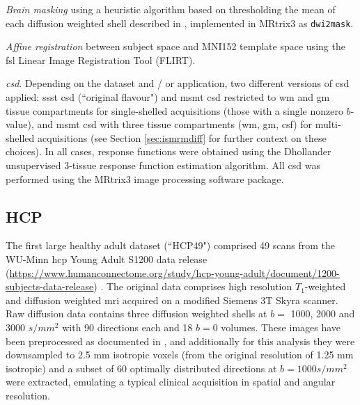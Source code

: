 \textit{Brain masking}\autocite{Tournier2019}
using a heuristic algorithm based on thresholding the mean of each diffusion weighted shell described in \textcite{Dhollander2016}, implemented in MRtrix3\autocite{Tournier2019} as \verb|dwi2mask|.

\textit{Affine registration} between subject space and MNI152\autocite{Fonov2011} template space using the \gls{fsl} Linear Image Registration Tool (FLIRT)\autocite{Jenkinson2001,Jenkinson2002}.

\textit{\Gls{csd}}. Depending on the dataset and / or application, two different versions of \gls{csd} applied: \gls{ssst} \gls{csd}\autocite{Tournier2007,Tournier2019} (``original flavour") and \gls{msmt} \gls{csd}\autocite{Jeurissen2014} restricted to \gls{wm} and \gls{gm} tissue compartments for single-shelled acquisitions (those with a single nonzero $b$-value),
and \gls{msmt} \gls{csd} with three tissue compartments (\gls{wm}, \gls{gm}, \gls{csf}) for multi-shelled acquisitions (see Section \ref{sec:ismrmdiff} for further context on these choices).
In all cases, response functions were obtained using the Dhollander unsupervised 3-tissue response function estimation algorithm\autocite{Dhollander2016,Dhollander2019}.
All \gls{csd} was performed using the MRtrix3 image processing software package\autocite{Tournier2019}.

\subsection{HCP}

The first large healthy adult dataset (``HCP49") comprised 49 scans from the WU-Minn \gls{hcp} Young Adult S1200 data release (\url{https://www.humanconnectome.org/study/hcp-young-adult/document/1200-subjects-data-release}) \autocite{VanEssen2013}.
The original data comprises high resolution $T_1$-weighted and diffusion weighted \gls{mri} acquired on a modified Siemens 3T Skyra scanner.
Raw diffusion data contains three diffusion weighted shells at $b=$ 1000, 2000 and 3000 $s/mm^2$ with 90 directions each and 18 $b=0$ volumes\autocite{Sotiropoulos2013}.
These images have been preprocessed as documented in \textcite{Glasser2013,Sotiropoulos2013},
and additionally for this analysis they were downsampled to 2.5 mm isotropic voxels (from the original resolution of 1.25 mm isotropic) and a subset of 60 optimally distributed directions at $b=1000 s/mm^2$ were extracted, emulating a typical clinical acquisition in spatial and angular resolution.

